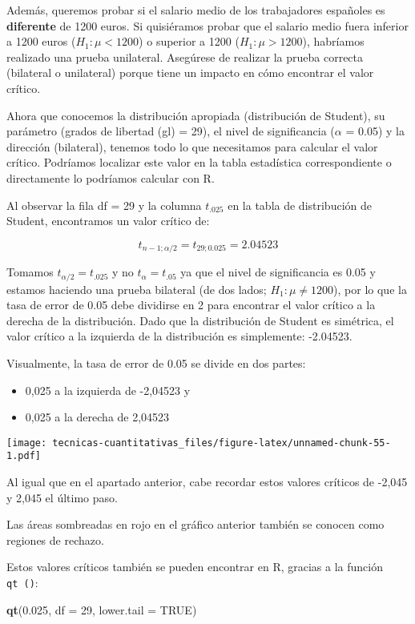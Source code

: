 \documentclass[
]{book}
\newenvironment{Shaded}{\begin{snugshade}}{\end{snugshade}}
\newcommand{\DataTypeTok}[1]{\textcolor[rgb]{0.13,0.29,0.53}{#1}}
\newcommand{\DecValTok}[1]{\textcolor[rgb]{0.00,0.00,0.81}{#1}}
\newcommand{\FloatTok}[1]{\textcolor[rgb]{0.00,0.00,0.81}{#1}}
\newcommand{\KeywordTok}[1]{\textcolor[rgb]{0.13,0.29,0.53}{\textbf{#1}}}
\newcommand{\NormalTok}[1]{#1}
\newcommand{\OtherTok}[1]{\textcolor[rgb]{0.56,0.35,0.01}{#1}}
\providecommand{\tightlist}{%
  \setlength{\itemsep}{0pt}\setlength{\parskip}{0pt}}
\begin{document}
Además, queremos probar si el salario medio de los trabajadores españoles es \textbf{diferente} de 1200 euros. Si quisiéramos probar que el salario medio fuera inferior a 1200 euros (\(H_1: \mu <1200\)) o superior a 1200 (\(H_1: \mu>1200\)), habríamos realizado una prueba unilateral. Asegúrese de realizar la prueba correcta (bilateral o unilateral) porque tiene un impacto en cómo encontrar el valor crítico.

Ahora que conocemos la distribución apropiada (distribución de Student), su parámetro (grados de libertad (gl) = 29), el nivel de significancia (\(\alpha\) = 0.05) y la dirección (bilateral), tenemos todo lo que necesitamos para calcular el valor crítico. Podríamos localizar este valor en la tabla estadística correspondiente o directamente lo podríamos calcular con R.

Al observar la fila df = 29 y la columna \(t_.025\) en la tabla de distribución de Student, encontramos un valor crítico de:

\[t_{n-1;\alpha/2} = t_{29; 0.025} = 2.04523\]

Tomamos \(t_{\alpha/2} = t_.025\) y no \(t_\alpha = t_.05\) ya que el nivel de significancia es 0.05 y estamos haciendo una prueba bilateral (de dos lados; \(H_1:\mu\ne 1200\)), por lo que la tasa de error de 0.05 debe dividirse en 2 para encontrar el valor crítico a la derecha de la distribución. Dado que la distribución de Student es simétrica, el valor crítico a la izquierda de la distribución es simplemente: -2.04523.

Visualmente, la tasa de error de 0.05 se divide en dos partes:

\begin{itemize}
\tightlist
\item
  0,025 a la izquierda de -2,04523 y
\item
  0,025 a la derecha de 2,04523
\end{itemize}

\texttt{[image: tecnicas-cuantitativas\_files/figure-latex/unnamed-chunk-55-1.pdf]}

Al igual que en el apartado anterior, cabe recordar estos valores críticos de -2,045 y 2,045 el último paso.

Las áreas sombreadas en rojo en el gráfico anterior también se conocen como regiones de rechazo.

Estos valores críticos también se pueden encontrar en R, gracias a la función \texttt{qt\ ()}:

\begin{Shaded}
\begin{Highlighting}[]
\KeywordTok{qt}\NormalTok{(}\FloatTok{0.025}\NormalTok{, }\DataTypeTok{df =} \DecValTok{29}\NormalTok{, }\DataTypeTok{lower.tail =} \OtherTok{TRUE}\NormalTok{)}
\end{Highlighting}
\end{Shaded}
\end{document}
